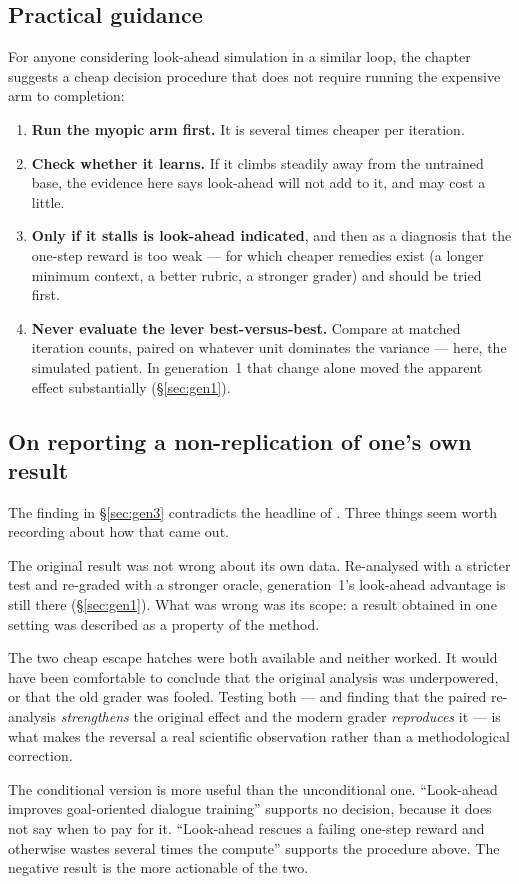 \subsection{Practical guidance}
For anyone considering look-ahead simulation in a similar loop, the chapter suggests a cheap
decision procedure that does not require running the expensive arm to completion:

\begin{enumerate}\itemsep2pt
  \item \textbf{Run the myopic arm first.} It is several times cheaper per iteration.
  \item \textbf{Check whether it learns.} If it climbs steadily away from the untrained base,
  the evidence here says look-ahead will not add to it, and may cost a little.
  \item \textbf{Only if it stalls is look-ahead indicated}, and then as a diagnosis that the
  one-step reward is too weak --- for which cheaper remedies exist (a longer minimum context, a
  better rubric, a stronger grader) and should be tried first.
  \item \textbf{Never evaluate the lever best-versus-best.} Compare at matched iteration counts,
  paired on whatever unit dominates the variance --- here, the simulated patient. In
  generation~1 that change alone moved the apparent effect substantially
  (\S\ref{sec:gen1}).
\end{enumerate}

\subsection{On reporting a non-replication of one's own result}
The finding in \S\ref{sec:gen3} contradicts the headline of \citet{baruch2025pto}. Three things
seem worth recording about how that came out.

The original result was not wrong about its own data. Re-analysed with a stricter test and
re-graded with a stronger oracle, generation~1's look-ahead advantage is still there
(\S\ref{sec:gen1}). What was wrong was its scope: a result obtained in one setting was
described as a property of the method.

The two cheap escape hatches were both available and neither worked. It would have been
comfortable to conclude that the original analysis was underpowered, or that the old grader was
fooled. Testing both --- and finding that the paired re-analysis \emph{strengthens} the original
effect and the modern grader \emph{reproduces} it --- is what makes the reversal a real
scientific observation rather than a methodological correction.

The conditional version is more useful than the unconditional one. ``Look-ahead improves
goal-oriented dialogue training'' supports no decision, because it does not say when to pay for
it. ``Look-ahead rescues a failing one-step reward and otherwise wastes several times the
compute'' supports the procedure above. The negative result is the more actionable of the two.
